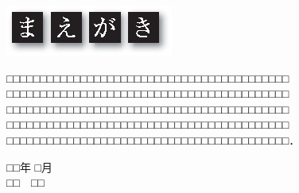﻿%

\vspace*{10mm}

\noindent
\hspace*{-1mm}\includegraphics[scale=1.0]{ch-head/pre01.eps}

\vspace{3mm}



□□□□□□□□□□□□□□□□□□□□□□□□□□□□□□□□□□□□□□□□□□
□□□□□□□□□□□□□□□□□□□□□□□□□□□□□□□□□□□□□□□□□□
□□□□□□□□□□□□□□□□□□□□□□□□□□□□□□□□□□□□□□□□□□
□□□□□□□□□□□□□□□□□□□□□□□□□□□□□□□□□□□□□□□□□□
□□□□□□□□□□□□□□□□□□□□□□□□□□□□□□□□□□□□□□□□□□．

\begin{flushright}
{\fontsize{11\JQ}{18H}\selectfont □□年 □月}\\[-1mm]
{\fontsize{15\JQ}{18H}\rmhfamily □□　□□}
\end{flushright}

